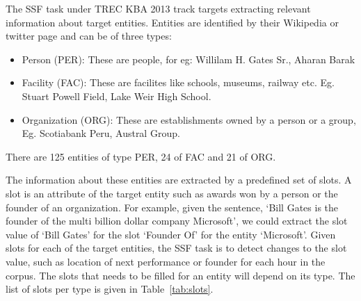The SSF task under TREC KBA 2013 track targets extracting relevant information about target entities. Entities are identified by their Wikipedia or twitter page and can be of three types:
\begin{itemize}
\item Person (PER): These are people, for eg: Willilam H. Gates Sr., Aharan Barak
\item Facility (FAC): These are facilites like schools, museums, railway etc. Eg. Stuart Powell Field, Lake Weir High School.
\item Organization (ORG): These are establishments owned by a person or a group, Eg. Scotiabank Peru, Austral Group.
\end{itemize}
There are 125 entities of type PER, 24 of FAC and 21 of ORG.

The information about these entities are extracted by a predefined set of slots. A slot is an attribute of the target entity such as awards won by a person or the founder of an organization. For example, given the sentence, ‘Bill Gates is the founder of the multi billion dollar company Microsoft’, we could extract the slot value of ‘Bill Gates’ for the slot ‘Founder Of’ for the entity ‘Microsoft’. Given slots for each of the target entities, the SSF task is to detect changes to the slot value, such as location of next performance or founder for each hour in the corpus. The slots that needs to be filled for an entity will depend on its type. The list of slots per type is given in Table~\ref{tab:slots}.


